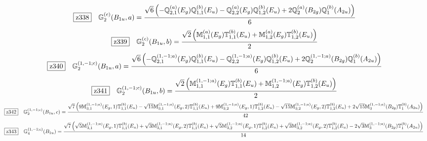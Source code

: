 \documentclass[fleqn,10pt,landscape]{jsarticle}
\begin{document}
\begin{dmath*}
\hspace*{3mm}\fbox{z338}\quad \mathbb{G}_{2}^{(c)}(B_{1u},a)=\frac{\sqrt{6} \left(- \mathbb{Q}_{2,1}^{(a)}(E_{g}) \mathbb{Q}_{1,1}^{(b)}(E_{u}) - \mathbb{Q}_{2,2}^{(a)}(E_{g}) \mathbb{Q}_{1,2}^{(b)}(E_{u}) + 2 \mathbb{Q}_{2}^{(a)}(B_{2g}) \mathbb{Q}_{1}^{(b)}(A_{2u})\right)}{6}
\end{dmath*}
\begin{dmath*}
\hspace*{3mm}\fbox{z339}\quad \mathbb{G}_{2}^{(c)}(B_{1u},b)=\frac{\sqrt{2} \left(\mathbb{M}_{1,1}^{(a)}(E_{g}) \mathbb{T}_{1,1}^{(b)}(E_{u}) + \mathbb{M}_{1,2}^{(a)}(E_{g}) \mathbb{T}_{1,2}^{(b)}(E_{u})\right)}{2}
\end{dmath*}
\begin{dmath*}
\hspace*{3mm}\fbox{z340}\quad \mathbb{G}_{2}^{(1,-1;c)}(B_{1u},a)=\frac{\sqrt{6} \left(- \mathbb{Q}_{2,1}^{(1,-1;a)}(E_{g}) \mathbb{Q}_{1,1}^{(b)}(E_{u}) - \mathbb{Q}_{2,2}^{(1,-1;a)}(E_{g}) \mathbb{Q}_{1,2}^{(b)}(E_{u}) + 2 \mathbb{Q}_{2}^{(1,-1;a)}(B_{2g}) \mathbb{Q}_{1}^{(b)}(A_{2u})\right)}{6}
\end{dmath*}
\begin{dmath*}
\hspace*{3mm}\fbox{z341}\quad \mathbb{G}_{2}^{(1,-1;c)}(B_{1u},b)=\frac{\sqrt{2} \left(\mathbb{M}_{1,1}^{(1,-1;a)}(E_{g}) \mathbb{T}_{1,1}^{(b)}(E_{u}) + \mathbb{M}_{1,2}^{(1,-1;a)}(E_{g}) \mathbb{T}_{1,2}^{(b)}(E_{u})\right)}{2}
\end{dmath*}
\begin{dmath*}
\hspace*{3mm}\fbox{z342}\quad \mathbb{G}_{2}^{(1,-1;c)}(B_{1u},c)=\frac{\sqrt{7} \left(9 \mathbb{M}_{3,1}^{(1,-1;a)}(E_{g},1) \mathbb{T}_{1,1}^{(b)}(E_{u}) - \sqrt{15} \mathbb{M}_{3,1}^{(1,-1;a)}(E_{g},2) \mathbb{T}_{1,1}^{(b)}(E_{u}) + 9 \mathbb{M}_{3,2}^{(1,-1;a)}(E_{g},1) \mathbb{T}_{1,2}^{(b)}(E_{u}) - \sqrt{15} \mathbb{M}_{3,2}^{(1,-1;a)}(E_{g},2) \mathbb{T}_{1,2}^{(b)}(E_{u}) + 2 \sqrt{15} \mathbb{M}_{3}^{(1,-1;a)}(B_{2g}) \mathbb{T}_{1}^{(b)}(A_{2u})\right)}{42}
\end{dmath*}
\begin{dmath*}
\hspace*{3mm}\fbox{z343}\quad \mathbb{G}_{4}^{(1,-1;c)}(B_{1u})=\frac{\sqrt{7} \left(\sqrt{5} \mathbb{M}_{3,1}^{(1,-1;a)}(E_{g},1) \mathbb{T}_{1,1}^{(b)}(E_{u}) + \sqrt{3} \mathbb{M}_{3,1}^{(1,-1;a)}(E_{g},2) \mathbb{T}_{1,1}^{(b)}(E_{u}) + \sqrt{5} \mathbb{M}_{3,2}^{(1,-1;a)}(E_{g},1) \mathbb{T}_{1,2}^{(b)}(E_{u}) + \sqrt{3} \mathbb{M}_{3,2}^{(1,-1;a)}(E_{g},2) \mathbb{T}_{1,2}^{(b)}(E_{u}) - 2 \sqrt{3} \mathbb{M}_{3}^{(1,-1;a)}(B_{2g}) \mathbb{T}_{1}^{(b)}(A_{2u})\right)}{14}
\end{dmath*}
\end{document}
